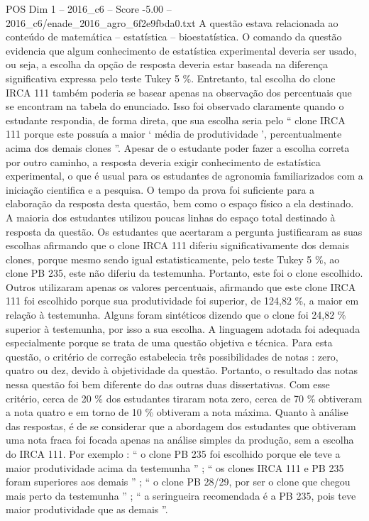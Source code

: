 \begin{textsample}{POS Dim 1 – 2016\_c6 – Score -5.00 – 2016\_c6/enade\_2016\_agro\_6f2e9fbda0.txt}
A questão estava relacionada ao conteúdo de matemática – estatística – bioestatística.
O comando da questão evidencia que algum conhecimento de estatística experimental deveria ser usado, ou seja, a escolha da opção de resposta deveria estar baseada na diferença significativa expressa pelo teste Tukey 5 \%.
Entretanto, tal escolha do clone IRCA 111 também poderia se basear apenas na observação dos percentuais que se encontram na tabela do enunciado.
Isso foi observado claramente quando o estudante respondia, de forma direta, que sua escolha seria pelo “ clone IRCA 111 porque este possuía a maior ‘ média de produtividade ’, percentualmente acima dos demais clones ”.
Apesar de o estudante poder fazer a escolha correta por outro caminho, a resposta deveria exigir conhecimento de estatística experimental, o que é usual para os estudantes de agronomia familiarizados com a iniciação cientifica e a pesquisa.
O tempo da prova foi suficiente para a elaboração da resposta desta questão, bem como o espaço físico a ela destinado.
A maioria dos estudantes utilizou poucas linhas do espaço total destinado à resposta da questão.
Os estudantes que acertaram a pergunta justificaram as suas escolhas afirmando que o clone IRCA 111 diferiu significativamente dos demais clones, porque mesmo sendo igual estatisticamente, pelo teste Tukey 5 \%, ao clone PB 235, este não diferiu da testemunha.
Portanto, este foi o clone escolhido.
Outros utilizaram apenas os valores percentuais, afirmando que este clone IRCA 111 foi escolhido porque sua produtividade foi superior, de 124,82 \%, a maior em relação à testemunha.
Alguns foram sintéticos dizendo que o clone foi 24,82 \% superior à testemunha, por isso a sua escolha.
A linguagem adotada foi adequada especialmente porque se trata de uma questão objetiva e técnica.
Para esta questão, o critério de correção estabelecia três possibilidades de notas : zero, quatro ou dez, devido à objetividade da questão.
Portanto, o resultado das notas nessa questão foi bem diferente do das outras duas dissertativas.
Com esse critério, cerca de 20 \% dos estudantes tiraram nota zero, cerca de 70 \% obtiveram a nota quatro e em torno de 10 \% obtiveram a nota máxima.
Quanto à análise das respostas, é de se considerar que a abordagem dos estudantes que obtiveram uma nota fraca foi focada apenas na análise simples da produção, sem a escolha do IRCA 111.
Por exemplo : “ o clone PB 235 foi escolhido porque ele teve a maior produtividade acima da testemunha ” ; “ os clones IRCA 111 e PB 235 foram superiores aos demais ” ; “ o clone PB 28/29, por ser o clone que chegou mais perto da testemunha ” ; “ a seringueira recomendada é a PB 235, pois teve maior produtividade que as demais ”.

\end{textsample}
